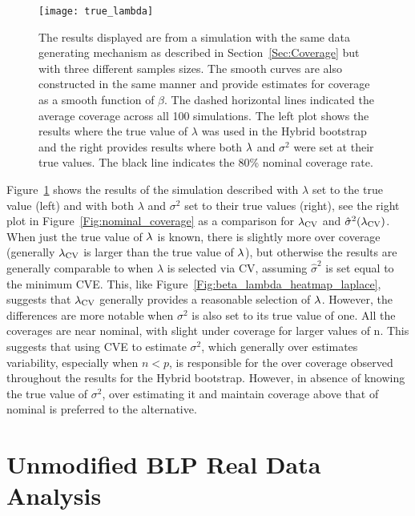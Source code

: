 \begin{appendices}
\begin{figure}[hbtp]
  \begin{center}
  \texttt{[image: true\_lambda]}
  \caption{\label{Fig:true_lambda} The results displayed are from a simulation with the same data generating mechanism as described in Section~\ref{Sec:Coverage} but with three different samples sizes. The smooth curves are also constructed in the same manner and provide estimates for coverage as a smooth function of $\beta$. The dashed horizontal lines indicated the average coverage across all 100 simulations. The left plot shows the results where the true value of $\lambda$ was used in the Hybrid bootstrap and the right provides results where both $\lambda$ and $\sigma^2$ were set at their true values. The black line indicates the 80\% nominal coverage rate.}
  \end{center}
\end{figure}

Figure~\ref{Fig:true_lambda} shows the results of the simulation described with $\lambda$ set to the true value (left) and with both $\lambda$ and $\sigma^2$ set to their true values (right), see the right plot in Figure~\ref{Fig:nominal_coverage} as a comparison for $\lambda_{\textrm{CV}}$ and $\hat{\sigma}^2(\lambda_{\textrm{CV}})$. When just the true value of $\lambda$ is known, there is slightly more over coverage (generally $\lambda_{\textrm{CV}}$ is larger than the true value of $\lambda$), but otherwise the results are generally comparable to when $\lambda$ is selected via CV, assuming $\hat{\sigma}^2$ is set equal to the minimum CVE. This, like Figure~\ref{Fig:beta_lambda_heatmap_laplace}, suggests that $\lambda_{\textrm{CV}}$ generally provides a reasonable selection of $\lambda$. However, the differences are more notable when $\sigma^2$ is also set to its true value of one. All the coverages are near nominal, with slight under coverage for larger values of n. This suggests that using CVE to estimate $\sigma^2$, which generally over estimates variability, especially when $n < p$, is responsible for the over coverage observed throughout the results for the Hybrid bootstrap. However, in absence of knowing the true value of $\sigma^2$, over estimating it and maintain coverage above that of nominal is preferred to the alternative. 

\newpage

\section{Unmodified BLP Real Data Analysis}
\label{Sup:C}


\end{appendices}

